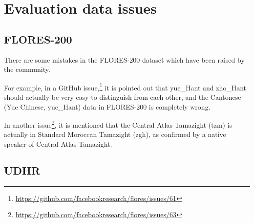 \documentclass[11pt]{article}
\def\modelname{\mbox{GlotLID-M}\xspace}
\def\flores{FLORES\xspace}
\def\tablabel#1{\label{tab:#1}\label{p:#1}}
\def\seclabel#1{\label{sec:#1}\label{p:#1}}
\begin{document}
\begin{table}[h]
\centering
{}
\caption{\modelname training hyperparameters}
\tablabel{tabhyperparameters}
\end{table}




\section{Evaluation data issues}

\subsection{\flores-200}\seclabel{flores-issues}

There are some mistakes in the \flores-200 dataset which have been raised by the community. 

For example, in a GitHub issue,\footnote{\url{https://github.com/facebookresearch/flores/issues/61}} it is pointed out that yue\_Hant and zho\_Hant should actually be very easy to distinguish from each other, and the Cantonese (Yue Chinese, yue\_Hant) data in \flores-200 is completely wrong.

In another issue\footnote{\url{https://github.com/facebookresearch/flores/issues/63}}, it is mentioned that the Central Atlas Tamazight (tzm) is actually in Standard Moroccan Tamazight (zgh), as confirmed by a native speaker of Central Atlas Tamazight.

\subsection{UDHR}\seclabel{udhr-issues}
\end{document}
